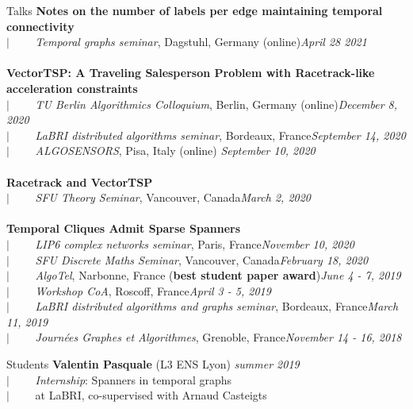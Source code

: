 \documentclass[french]{resume} %
\begin{document}
\begin{rSection}{Talks}
{\bf Notes on the number of labels per edge maintaining temporal connectivity} \\
$| \qquad$ \textit{Temporal graphs seminar}, Dagstuhl, Germany (online)\hfill {\em April 28 2021} 
\\ \\	
{\bf VectorTSP: A Traveling Salesperson Problem with Racetrack-like acceleration constraints}\\
$| \qquad$ \textit{TU Berlin Algorithmics Colloquium}, Berlin, Germany (online)\hfill {\em December 8, 2020}\\
$| \qquad$ \textit{LaBRI distributed algorithms seminar}, Bordeaux, France\hfill {\em September 14, 2020}\\
$| \qquad$ \textit{ALGOSENSORS}, Pisa, Italy (online) \hfill {\em September 10, 2020} 
\\ \\
{\bf Racetrack and VectorTSP} \\
$| \qquad$ \textit{SFU Theory Seminar}, Vancouver, Canada\hfill {\em March 2, 2020}
\\ \\
{\bf Temporal Cliques Admit Sparse Spanners} \\
$| \qquad$ \textit{LIP6 complex networks seminar}, Paris, France\hfill {\em November 10, 2020} \\
$| \qquad$ \textit{SFU Discrete Maths Seminar}, Vancouver, Canada\hfill {\em February 18, 2020} \\
$| \qquad$ \textit{AlgoTel}, Narbonne, France (\textbf{best student paper award})\hfill {\em June 4 - 7, 2019} \\
$| \qquad$ \textit{Workshop CoA}, Roscoff, France\hfill {\em April 3 - 5, 2019} \\
$| \qquad$ \textit{LaBRI distributed algorithms and graphs seminar}, Bordeaux, France\hfill {\em March 11, 2019} \\
$| \qquad$ \textit{Journées Graphes et Algorithmes}, Grenoble, France\hfill {\em November 14 - 16, 2018}
\end{rSection}

\begin{rSection}{Students}
{\bf Valentin Pasquale} (L3 ENS Lyon) \hfill {\em summer 2019} 
\\
$| \qquad$ \textit{Internship}: Spanners in temporal graphs\\
$| \qquad$ at LaBRI, co-supervised with Arnaud Casteigts
\end{rSection}
\end{document}
